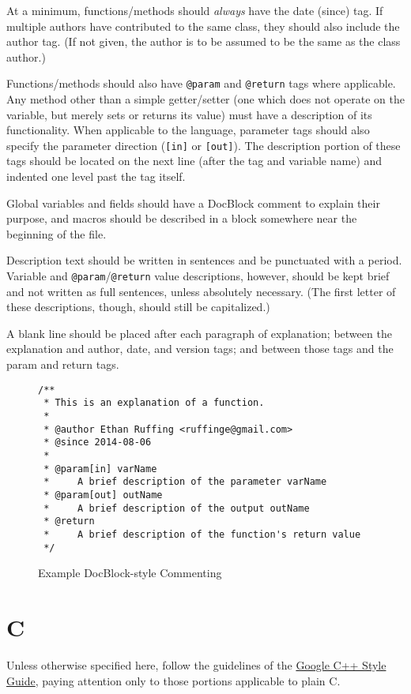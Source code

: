 \documentclass[12pt,letter]{memoir} %
\begin{document}
				At a minimum, functions/methods should \emph{always} have the date (since) tag. If
				multiple authors have contributed to the same class, they should also include
				the author tag. (If not given, the author is to be assumed to be the same as the
				class author.)
				
				Functions/methods should also have \texttt{@param} and \texttt{@return} tags where applicable.
				Any method other than a simple getter/setter (one which does not operate on the
				variable, but merely sets or returns its value) must have a description of its
				functionality. When applicable to the language, parameter tags should also
				specify the parameter direction (\texttt{[in]} or \texttt{[out]}). The description
				portion of these tags should be located on the next line (after the tag and variable
				name) and indented one level past the tag itself.
				
				Global variables and fields should have a DocBlock comment to explain their
				purpose, and macros should be described in a block somewhere near the
				beginning of the file.
				
				Description text should be written in sentences and be punctuated with a period.
				Variable and \texttt{@param}/\texttt{@return} value descriptions, however, should be kept
				brief and not written as full sentences, unless absolutely necessary. (The first
				letter of these descriptions, though, should still be capitalized.)
				
				A blank line should be placed after each paragraph of explanation; between the
				explanation and author, date, and version tags; and between those tags and the
				param and return tags.
	
				\begin{figure}[h!]
					\label{lst:docblock-functional}
					\caption{Example DocBlock-style Commenting}
					\lstset{language=C}
					\begin{lstlisting}
/**
 * This is an explanation of a function.
 * 
 * @author Ethan Ruffing <ruffinge@gmail.com>
 * @since 2014-08-06
 * 
 * @param[in] varName
 *     A brief description of the parameter varName
 * @param[out] outName
 *     A brief description of the output outName
 * @return
 *     A brief description of the function's return value
 */
					\end{lstlisting}
				\end{figure}
	\section{C}
		Unless otherwise specified here, follow the guidelines of the
		\href{http://google-styleguide.googlecode.com/svn/trunk/cppguide.xml}{Google C++ Style Guide},
		paying attention only to those portions applicable to plain C.
\end{document}

